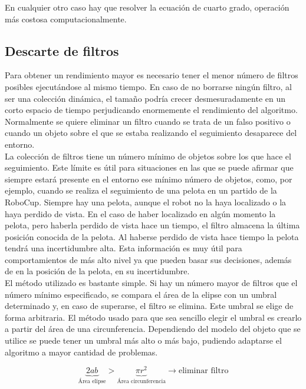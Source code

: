 \begin{enumerate}
En cualquier otro caso hay que resolver la ecuación de cuarto grado, operación más costosa computacionalmente.

\end{enumerate}

\subsection{Descarte de filtros}
\label{subsec:descartefiltros}

Para obtener un rendimiento mayor es necesario tener el menor número de filtros posibles ejecutándose al mismo tiempo. En caso de no borrarse ningún filtro, al ser una colección dinámica, el tamaño podría crecer desmesuradamente en un corto espacio de tiempo perjudicando enormemente el rendimiento del algoritmo. Normalmente se quiere eliminar un filtro cuando se trata de un falso positivo o cuando un objeto sobre el que se estaba realizando el seguimiento desaparece del entorno.\\

La colección de filtros tiene un número mínimo de objetos sobre los que hace el seguimiento. Este límite es útil para situaciones en las que se puede afirmar que siempre estará presente en el entorno ese mínimo número de objetos, como, por ejemplo, cuando se realiza el seguimiento de una pelota en un partido de la RoboCup. Siempre hay una pelota, aunque el robot no la haya localizado o la haya perdido de vista. En el caso de haber localizado en algún momento la pelota, pero haberla perdido de vista hace un tiempo, el filtro almacena la última posición conocida de la pelota. Al haberse perdido de vista hace tiempo la pelota tendrá una incertidumbre alta. Esta información es muy útil para comportamientos de más alto nivel ya que pueden basar sus decisiones, además de en la posición de la pelota, en su incertidumbre.\\

El método utilizado es bastante simple. Si hay un número mayor de filtros que el número mínimo especificado, se compara el área de la elipse con un umbral determinado y, en caso de superarse, el filtro se elimina. Este umbral se elige de forma arbitraria. El método usado para que sea sencillo elegir el umbral es crearlo a partir del área de una circunferencia. Dependiendo del modelo del objeto que se utilice se puede tener un umbral más alto o más bajo, pudiendo adaptarse el algoritmo a mayor cantidad de problemas.

\begin{equation}
  \underbrace{2ab}_{\text{Área elipse}} > \underbrace{\pi r^2}_{\text{Área circunferencia}} \rightarrow \text{eliminar filtro}
\end{equation}

